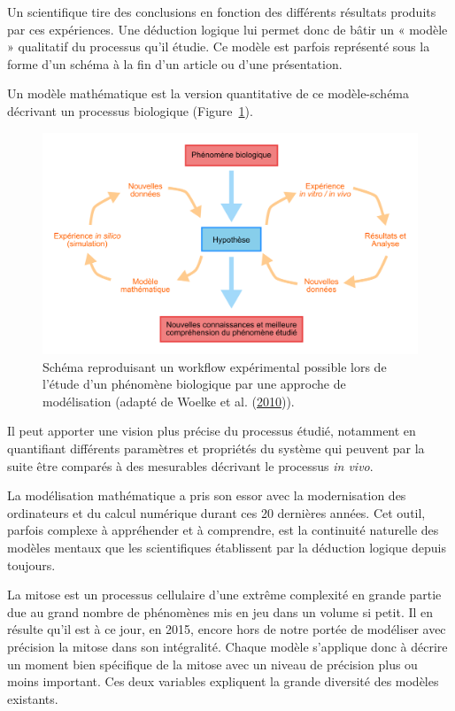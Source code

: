 \documentclass[12pt,a4paper,twoside,openright]{book}
\begin{document}
Un scientifique tire des conclusions en fonction des différents
résultats produits par ces expériences. Une déduction logique lui permet
donc de bâtir un « modèle » qualitatif du processus qu'il étudie. Ce
modèle est parfois représenté sous la forme d'un schéma à la fin d'un
article ou d'une présentation.

Un modèle mathématique est la version quantitative de ce modèle-schéma
décrivant un processus biologique (Figure~\ref{fig:modelling}).

\begin{figure}[htbp]
\centering
\includegraphics{figures/intro/modelling.png}
\caption[Workflow de l'approche modélisation en biologie]{\label{fig:modelling}Schéma
reproduisant un workflow expérimental possible lors de l'étude d'un
phénomène biologique par une approche de modélisation (adapté de Woelke
et al. (\hyperref[ref-Woelke2010]{2010})).}
\end{figure}

Il peut apporter une vision plus précise du processus étudié, notamment
en quantifiant différents paramètres et propriétés du système qui
peuvent par la suite être comparés à des mesurables décrivant le
processus \emph{in vivo}.

La modélisation mathématique a pris son essor avec la modernisation des
ordinateurs et du calcul numérique durant ces 20 dernières années. Cet
outil, parfois complexe à appréhender et à comprendre, est la continuité
naturelle des modèles mentaux que les scientifiques établissent par la
déduction logique depuis toujours.

La mitose est un processus cellulaire d'une extrême complexité en grande
partie due au grand nombre de phénomènes mis en jeu dans un volume si
petit. Il en résulte qu'il est à ce jour, en 2015, encore hors de notre
portée de modéliser avec précision la mitose dans son intégralité.
Chaque modèle s'applique donc à décrire un moment bien spécifique de la
mitose avec un niveau de précision plus ou moins important. Ces deux
variables expliquent la grande diversité des modèles existants.
\end{document}
